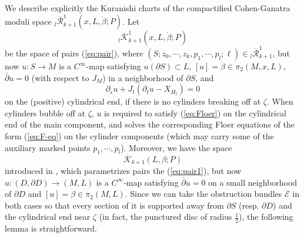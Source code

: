 \documentclass[a4paper]{article}
\numberwithin{equation}{section}
\begin{document}
We describe explicitly the Kuranishi charts of the compactified Cohen-Ganatra moduli space ${}_l\overline{\mathcal{R}}_{k+1}^1(x,L,\ring{\beta};P)$. Let
\begin{equation}
{}_l\overline{\mathcal{K}}_{k+1}^1(x,L,\ring{\beta};P)
\end{equation}
be the space of pairs (\ref{eq:pair}), where $(S;z_0,\cdots,z_k,p_1,\cdots,p_l;\ell)\in{}_l\overline{\mathcal{R}}_{k+1}^1$, but now $u:S\rightarrow M$ is a $C^\infty$-map satisfying $u(\partial S)\subset L$, $[u]=\ring{\beta}\in\pi_2(M,x,L)$, $\bar{\partial} u=0$ (with respect to $J_M$) in a neighborhood of $\partial S$, and
\begin{equation}\label{eq:Floer}
\partial_su+J_t(\partial_tu-X_{H_t})=0
\end{equation}
on the (positive) cylindrical end, if there is no cylinders breaking off at $\zeta$. When cylinders bubble off at $\zeta$, $u$ is required to satisfy (\ref{eq:Floer}) on the cylindrical end of the main component, and solves the corresponding Floer equations of the form (\ref{eq:F-eq}) on the cylinder components (which may carry some of the auxiliary marked points $p_1,\cdots,p_l$). Moreover, we have the space
\begin{equation}
\overline{\mathcal{K}}_{k+1}(L,\beta;P)
\end{equation}
introduced in \cite{ki2}, which parametrizes pairs the (\ref{eq:pair1}), but now $u:(D,\partial D)\rightarrow(M,L)$ is a $C^\infty$-map satisfying $\bar{\partial}u=0$ on a small neighborhood of $\partial D$ and $[u]=\beta\in\pi_2(M,L)$. Since we can take the obstruction bundles $\mathcal{E}$ in both cases so that every section of it is supported away from $\partial S$ (resp. $\partial D$) and the cylindrical end near $\zeta$ (in fact, the punctured disc of radius $\frac{1}{2}$), the following lemma is straightforward.
\end{document}
